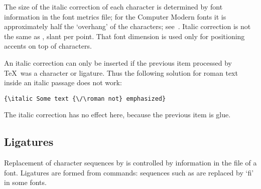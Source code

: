 \documentclass{book}
\begin{document}
The size of the italic correction of each character
is determined by font information
in the font metrics file; for the Computer Modern fonts it is
approximately half the `overhang' of the characters;
see~\cite{K:partE}.
Italic correction is not the same as , slant
per point. That font dimension is used only for positioning
accents on top of characters.

An italic correction can only be inserted if the previous item
processed
by \TeX\ was a character or ligature. Thus the
following solution for roman text inside an italic passage
does not work:
\begin{verbatim}
{\italic Some text {\/\roman not} emphasized}
\end{verbatim}
The italic correction has no effect here,
because the previous item is glue.

\subsection{Ligatures}

Replacement of character sequences by  is controlled
by information in the  file of a font.
Ligatures are formed from  commands:
sequences such as  are replaced by `fi' in some fonts.
\end{document}

